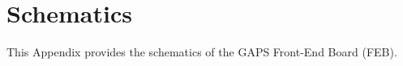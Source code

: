 \chapter{Schematics} \label{appendixPCB}

This Appendix provides the schematics of the GAPS Front-End Board (FEB).




